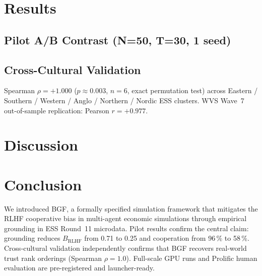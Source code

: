 \documentclass[sigconf,review]{acmart}
\begin{document}
\section{Results}

\subsection{Pilot A/B Contrast (N=50, T=30, 1 seed)}


\subsection{Cross-Cultural Validation}

Spearman $\rho = +1.000$ ($p \approx 0.003$, $n{=}6$, exact permutation
test) across Eastern / Southern / Western / Anglo / Northern / Nordic
ESS clusters.  WVS Wave~7 out-of-sample replication: Pearson $r = +0.977$.

\section{Discussion}


\section{Conclusion}

We introduced BGF, a formally specified simulation framework that
mitigates the RLHF cooperative bias in multi-agent economic simulations
through empirical grounding in ESS Round~11 microdata.  Pilot results
confirm the central claim: grounding reduces $B_\text{RLHF}$ from 0.71
to 0.25 and cooperation from 96\,\% to 58\,\%.  Cross-cultural
validation independently confirms that BGF recovers real-world trust
rank orderings (Spearman $\rho = 1.0$).  Full-scale GPU runs and Prolific
human evaluation are pre-registered and launcher-ready.




\end{document}
